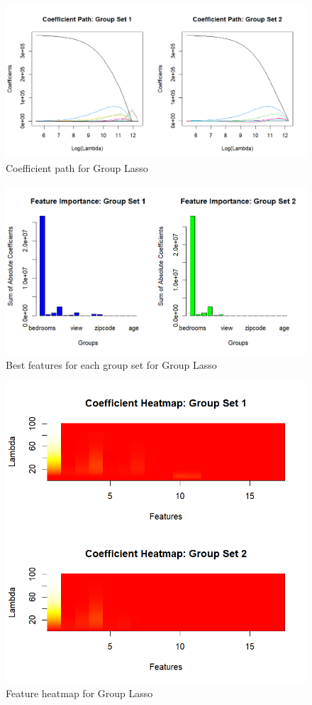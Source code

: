 \documentclass[a4paper, 9pt]{article}
\begin{document}
\begin{figure}[H]
\includegraphics[scale=0.7]{gglassocoefpath}
\centering
\caption{Coefficient path for Group Lasso}
\end{figure}

\begin{figure}[H]
\includegraphics[scale=0.8]{gglassofeatures}
\centering
\caption{Best features for each group set for Group Lasso}
\end{figure}

\begin{figure}[H]
\includegraphics[scale=0.8]{gglassoheat}
\centering
\caption{Feature heatmap for Group Lasso}
\end{figure}
\end{document}
